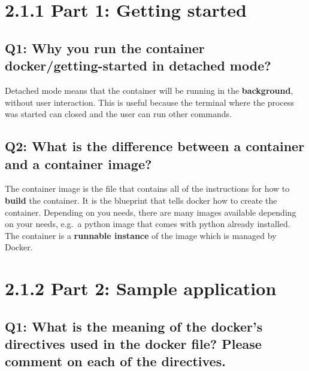 \documentclass[
]{article}
\author{}
\date{}
\begin{document}
\hypertarget{part-1-getting-started}{%
\section{2.1.1 Part 1: Getting started}\label{part-1-getting-started}}

\hypertarget{q1-why-you-run-the-container-dockergetting-started-in-detached-mode}{%
\subsection{Q1: Why you run the container docker/getting-started in
detached
mode?}\label{q1-why-you-run-the-container-dockergetting-started-in-detached-mode}}

Detached mode means that the container will be running in the
\textbf{background}, without user interaction. This is useful because
the terminal where the process was started can closed and the user can
run other commands.

\hypertarget{q2-what-is-the-difference-between-a-container-and-a-container-image}{%
\subsection{Q2: What is the difference between a container and a
container
image?}\label{q2-what-is-the-difference-between-a-container-and-a-container-image}}

The container image is the file that contains all of the instructions
for how to \textbf{build} the container. It is the blueprint that tells
docker how to create the container. Depending on you needs, there are
many images available depending on your needs, e.g.~a python image that
comes with python already installed. The container is a \textbf{runnable
instance} of the image which is managed by Docker.

\hypertarget{part-2-sample-application}{%
\section{2.1.2 Part 2: Sample
application}\label{part-2-sample-application}}

\hypertarget{q1-what-is-the-meaning-of-the-dockers-directives-used-in-the-docker-file-please-comment-on-each-of-the-directives.}{%
\subsection{Q1: What is the meaning of the docker’s directives used in
the docker file? Please comment on each of the
directives.}\label{q1-what-is-the-meaning-of-the-dockers-directives-used-in-the-docker-file-please-comment-on-each-of-the-directives.}}
\end{document}
